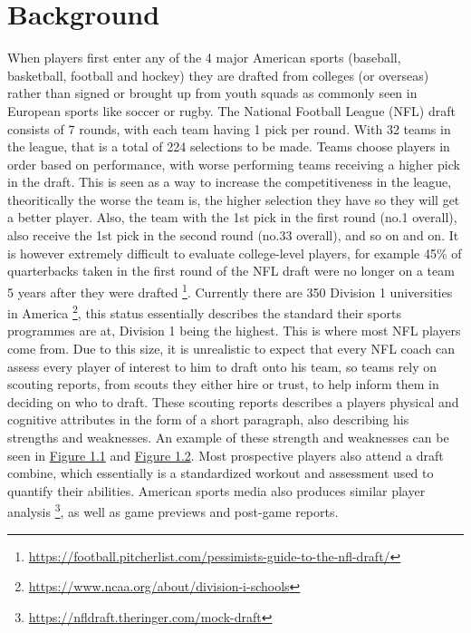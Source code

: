 \documentclass[oneside,12pt]{Classes/RoboticsLaTeX}
\begin{document}
\section{Background}
When players first enter any of the 4 major American sports (baseball, basketball, football and hockey) they are
drafted from colleges (or overseas) rather than signed or brought up from youth squads as commonly seen in
European sports like soccer or rugby. The National Football League (NFL) draft consists of 7 rounds, with each team
having 1 pick per round. With 32 teams in the league, that is a total of 224 selections to be made. Teams choose players in order based on performance, with worse performing teams 
receiving a higher pick in the draft. This is seen as a way to increase the competitiveness in the league, theoritically the worse the 
team is, the higher selection they have so they will get a better player. Also, the team with the 1st pick in the first round (no.1 overall), also 
receive the 1st pick in the second round (no.33 overall), and so on and on. It is however extremely difficult to evaluate college-level players,
for example 45\% of quarterbacks taken in the first round of the NFL draft were no longer on a team 5 years after they were drafted \footnote{\url{https://football.pitcherlist.com/pessimists-guide-to-the-nfl-draft/}}.
Currently there are 350 Division 1 universities in America \footnote{\url{https://www.ncaa.org/about/division-i-schools}}, this status
essentially describes the standard their sports programmes are at, Division 1 being the highest. This is where most
NFL players come from. Due to this size, it is unrealistic to expect that every NFL coach can assess every player of
interest to him to draft onto his team, so teams rely on scouting reports, from scouts they either hire or trust, to
help inform them in deciding on who to draft. These scouting reports describes a players physical and cognitive
attributes in the form of a short paragraph, also describing his strengths and weaknesses. An example of these strength and weaknesses can be seen in \hyperref[fig:bateman_s]{Figure 1.1} and \hyperref[fig:bateman_w]{Figure 1.2}. 
Most prospective players also attend a draft combine, which essentially is a standardized workout and assessment used to quantify their abilities. American sports media also produces
similar player analysis \footnote{\url{https://nfldraft.theringer.com/mock-draft}}, as well as game previews and post-game reports.
\end{document}
